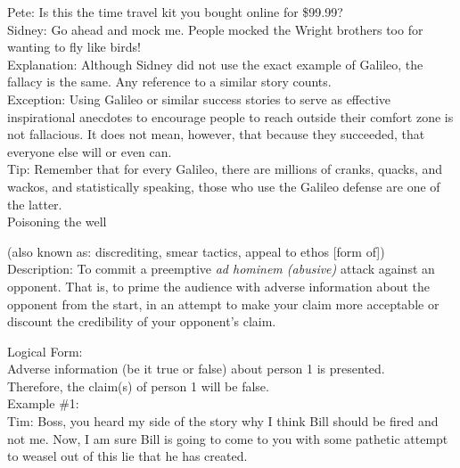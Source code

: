 \documentclass[a4paper,12pt,single,pdftex]{scrartcl}
\begin{document}
    
      Pete: Is this the time travel kit you bought online for \$99.99?
    \\

    
      Sidney: Go ahead and mock me. People mocked the Wright brothers too for wanting to fly like birds!
    \\

    
      Explanation: Although Sidney did not use the exact example of Galileo, the fallacy is the same. Any reference to a similar story counts.
    \\

    
      Exception: Using Galileo or similar success stories to serve as effective inspirational anecdotes to encourage people to reach outside their comfort zone is not fallacious. It does not mean, however, that because they succeeded, that everyone else will or even can.
    \\

    
      Tip: Remember that for every Galileo, there are millions of cranks, quacks, and wackos, and statistically speaking, those who use the Galileo defense are one of the latter.
    \\

  

Poisoning the well
    
      (also known as: discrediting, smear tactics, appeal to ethos [form of])
    \\

  
    Description: To commit a preemptive {\it ad hominem (abusive)}  attack against an opponent.  That is, to prime the audience with adverse information about the opponent from the start, in an attempt to make your claim more acceptable or discount the credibility of your opponent’s claim.

    
      Logical Form:
    \\

    
      Adverse information (be it true or false) about person 1 is presented.
    \\

    
      Therefore, the claim(s) of person 1 will be false.
    \\

    
      Example \#1:
    \\

    
      Tim: Boss, you heard my side of the story why I think Bill should be fired and not me.  Now, I am sure Bill is going to come to you with some pathetic attempt to weasel out of this lie that he has created.
    \\
\end{document}
